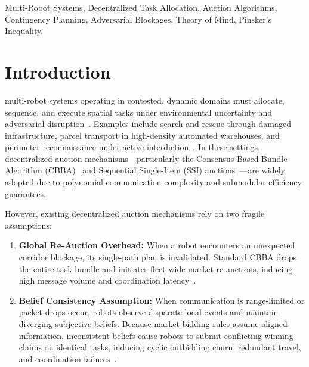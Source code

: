 \documentclass[lettersize,journal]{IEEEtran}
\begin{document}
\begin{IEEEkeywords}
Multi-Robot Systems, Decentralized Task Allocation, Auction Algorithms, Contingency Planning, Adversarial Blockages, Theory of Mind, Pinsker's Inequality.
\end{IEEEkeywords}

\section{Introduction}
 multi-robot systems operating in contested, dynamic domains must allocate, sequence, and execute spatial tasks under environmental uncertainty and adversarial disruption~\cite{choi2009cbba, wilde2022online, korsah2013comprehensive, gerkey2004formal, dias2006market, nunes2017taxonomy}. Examples include search-and-rescue through damaged infrastructure, parcel transport in high-density automated warehouses, and perimeter reconnaissance under active interdiction~\cite{agmon2011multi, bopardikar2014dynamic, sujit2008unmanned}. In these settings, decentralized auction mechanisms---particularly the Consensus-Based Bundle Algorithm (CBBA)~\cite{choi2009cbba} and Sequential Single-Item (SSI) auctions~\cite{koenig2006ssi}---are widely adopted due to polynomial communication complexity and submodular efficiency guarantees.

However, existing decentralized auction mechanisms rely on two fragile assumptions:
\begin{enumerate}[leftmargin=*,itemsep=1pt,topsep=2pt,parsep=0pt]
    \item \textbf{Global Re-Auction Overhead:} When a robot encounters an unexpected corridor blockage, its single-path plan is invalidated. Standard CBBA drops the entire task bundle and initiates fleet-wide market re-auctions, inducing high message volume and coordination latency~\cite{buckman2019partial, otte2020auctions}.
    \item \textbf{Belief Consistency Assumption:} When communication is range-limited or packet drops occur, robots observe disparate local events and maintain diverging subjective beliefs. Because market bidding rules assume aligned information, inconsistent beliefs cause robots to submit conflicting winning claims on identical tasks, inducing cyclic outbidding churn, redundant travel, and coordination failures~\cite{kundu2024multi, alighanbari2005implicit, tsiogkas2018decentralized, ghaffarkhah2011communication}.
\end{enumerate}
\end{document}
